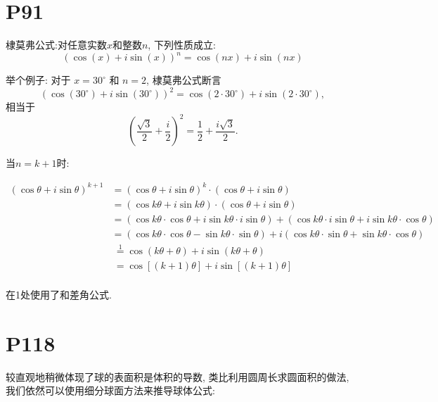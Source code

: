 \documentclass{book}
\begin{document}
        \section{\textcolor[rgb]{0.11,0.65,0.52}{P91}}
        \begin{boxB}
            棣莫弗公式:对任意实数${\displaystyle x}$和整数${\displaystyle n}$, 下列性质成立: $$( \cos (x) + i \sin (x) )^n = \cos (nx) + i \sin (nx)$$
        \end{boxB}
        举个例子: 对于 ${\displaystyle x=30^{\circ }}$ 和 ${\displaystyle n=2}$, 棣莫弗公式断言 $${\displaystyle \left(\cos(30^{\circ })+i\sin(30^{\circ })\right)^{2}=\cos(2\cdot 30^{\circ })+i\sin(2\cdot 30^{\circ }),}$$相当于$${\displaystyle \left({\frac {\sqrt {3}}{2}}+{\frac {i}{2}}\right)^{2}={\frac {1}{2}}+{\frac {i{\sqrt {3}}}{2}}.}$$

        当$n=k+1$时:

        ${\displaystyle {\begin{aligned}(\cos \theta +i\sin \theta )^{k+1}&=(\cos \theta +i\sin \theta )^{k}\cdot (\cos \theta +i\sin \theta )\\&=(\cos k\theta +i\sin k\theta )\cdot (\cos \theta +i\sin \theta )\\&=(\cos k\theta \cdot \cos \theta +i\sin k\theta \cdot i\sin \theta )+(\cos k\theta \cdot i\sin \theta +i\sin k\theta \cdot \cos \theta )\\&=(\cos k\theta \cdot \cos \theta -\sin k\theta \cdot \sin \theta )+i(\cos k\theta \cdot \sin \theta +\sin k\theta \cdot \cos \theta )\\&\ {\overset {1}{=}}\cos(k\theta +\theta )+i\sin(k\theta +\theta )\\&\ =\cos[(k+1)\theta ]+i\sin[(k+1)\theta ]\\\end{aligned}}}$

        在1处使用了和差角公式.

        \section{\textcolor[rgb]{0.11,0.65,0.52}{P118}}
        较直观地稍微体现了球的表面积是体积的导数, 类比利用圆周长求圆面积的做法, 我们依然可以使用细分球面方法来推导球体公式:
        
\end{document}
